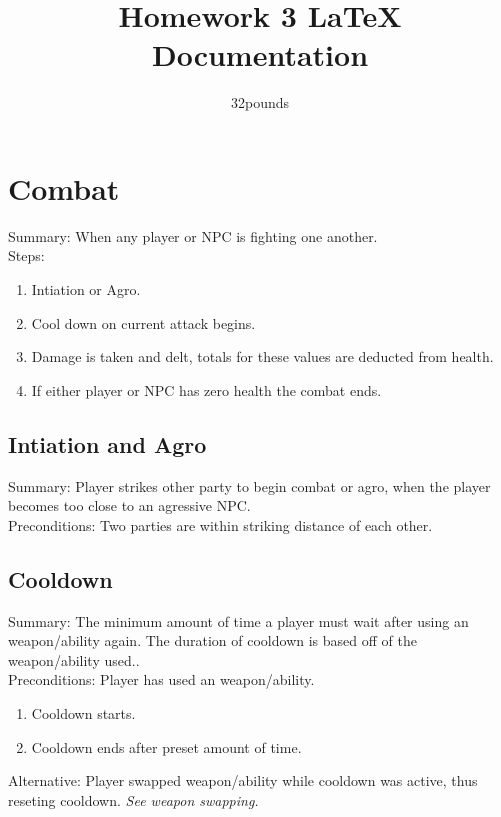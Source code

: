 \documentclass{report}
\author{32pounds}
\begin{document}
    \title{Homework 3 LaTeX Documentation}
    \maketitle
    \clearpage
    \chapter{Combat}
    Summary: When any player or NPC is fighting one another.\\
    
    Steps:
    \begin{enumerate}
        \item Intiation or Agro.
        \item Cool down on current attack begins.
        \item Damage is taken and delt, totals for these values are deducted from health.
        \item If either player or NPC has zero health the combat ends.
    \end{enumerate}
    
    \section{Intiation and Agro}
    Summary: Player strikes other party to begin combat or agro, when the player becomes too close to an agressive NPC.\\
    Preconditions: Two parties are within striking distance of each other. %
    
    \section{Cooldown}
    Summary: The minimum amount of time a player must wait after using an weapon/ability again. The duration of cooldown is based off of the weapon/ability used..\\ %
    Preconditions: Player has used an weapon/ability.\\
    
    \begin{enumerate}
        \item Cooldown starts.
        \item Cooldown ends after preset amount of time.
    \end{enumerate}
    Alternative: Player swapped weapon/ability while cooldown was active, thus reseting cooldown. \textit{See weapon swapping.}
\end{document}
